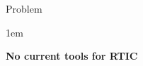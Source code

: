 \begin{frame}{Problem}
    \begin{itemize-size}{1em}
        \item \textbf{No current tools for RTIC}
        
    \end{itemize-size}
    
\end{frame}
